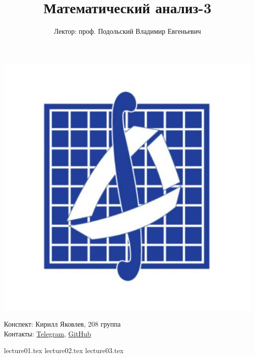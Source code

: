 \documentclass[a4paper, 12pt]{article}
\title{\textbf{Математический анализ-3}}
\author{Лектор: проф. Подольский Владимир Евгеньевич}
\begin{document}
    
\fontsize{14pt}{20pt}\selectfont
\maketitle
\vspace{0.3cm}
\begin{center}
    \includegraphics[width=0.75\linewidth]{Images/mehmat.png}
\end{center}
\vspace{1.5cm}
\begin{center}
    Конспект: Кирилл Яковлев, 208 группа\\
    Контакты: \href{https://t.me/fourkenz}{Telegram}, \href{https://github.com/yakovlevki}{GitHub}\\
\end{center}
    
\newpage
\tableofcontents
\newpage

{lecture01.tex}
{lecture02.tex}
{lecture03.tex}
\end{document}

